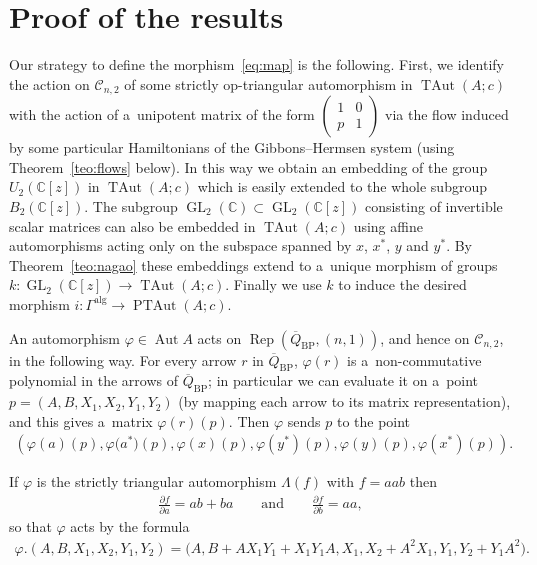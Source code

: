 \documentclass[11pt]{article}
\newcommand{\bb}[1]{\mathbb{#1}}
\newcommand{\app}[3]{#1\colon #2\to #3}
\newcommand{\ol}[1]{\overline{#1}}
\newcommand{\smm}[1]{\left(\begin{smallmatrix} #1\end{smallmatrix}\right)}
\DeclareMathOperator{\GL}{GL}
\DeclareMathOperator{\Aut}{Aut}
\DeclareMathOperator{\TAut}{TAut}
\DeclareMathOperator{\PTAut}{PTAut}
\DeclareMathOperator{\Rep}{Rep}
\begin{document}
\section{Proof of the results}

Our strategy to def\/ine the morphism~\eqref{eq:map} is the following.
First, we identify the action on \(\mathcal{C}_{n,2}\) of some strictly op-triangular automorphism in
\(\TAut(A;c)\) with the action of a~unipotent matrix of the form \(\smm{1 & 0
\\ %
p & 1}\) via the f\/low induced by some particular Hamiltonians of the Gibbons--Hermsen system (using
Theorem~\ref{teo:flows} below).
In this way we obtain an embedding of the group \(U_{2}(\bb{C}[z])\) in \(\TAut(A;c)\) which is easily
extended to the whole subgroup \(B_{2}(\bb{C}[z])\).
The subgroup \(\GL_{2}(\bb{C})\subset \GL_{2}(\bb{C}[z])\) consisting of invertible scalar matrices can
also be embedded in \(\TAut(A;c)\) using af\/f\/ine automorphisms acting only on the subspace spanned by
\(x\), \(x^{*}\), \(y\) and \(y^{*}\).
By Theorem~\ref{teo:nagao} these embeddings extend to a~unique morphism of groups
\(\app{k}{\GL_{2}(\bb{C}[z])}{\TAut(A;c)}\).
Finally we use \(k\) to induce the desired morphism \(\app{i}{\Gamma^{\mathrm{alg}}}{\PTAut(A;c)}\).

An automorphism \(\varphi\in \Aut A\) acts on \(\Rep(\ol{Q}_{\mathrm{BP}},(n,1))\), and hence on
\(\mathcal{C}_{n,2}\), in the following way.
For every arrow \(r\) in \(\ol{Q}_{\mathrm{BP}}\), \(\varphi(r)\) is a~non-commutative polynomial in the
arrows of \(\ol{Q}_{\mathrm{BP}}\); in particular we can evaluate it on a~point \(p =
(A,B,X_{1},X_{2},Y_{1},Y_{2})\) (by mapping each arrow to its matrix representation), and this gives
a~matrix \(\varphi(r)(p)\).
Then \(\varphi\) sends \(p\) to the point
\begin{gather}
\label{eq:act-aut}
(\varphi(a)(p),\varphi\big(a^{*}\big)(p),\varphi(x)(p),\varphi(y^{*})(p),\varphi(y)(p),\varphi(x^{*})(p)).
\end{gather}

\begin{example}
If \(\varphi\) is the strictly triangular automorphism \(\Lambda(f)\) with \(f = aab\) then
\begin{gather*}
\frac{\partial f}{\partial a}=ab+ba \qquad \text{and}\qquad \frac{\partial f}{\partial b}=aa,
\end{gather*}
so that \(\varphi\) acts by the formula
\begin{gather*}
\varphi.(A,B,X_{1},X_{2},Y_{1},Y_{2})=\big(A,B+AX_{1}Y_{1}+X_{1}Y_{1}A,X_{1},X_{2}+A^{2}X_{1},Y_{1},Y_{2}
+Y_{1}A^{2}\big).
\end{gather*}
\end{example}
\end{document}
